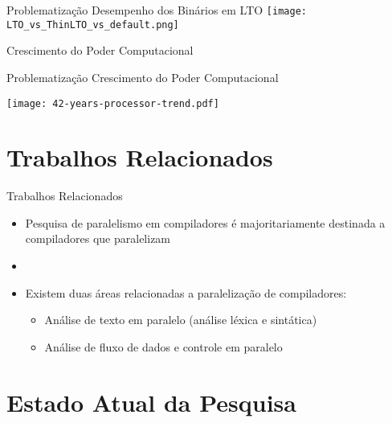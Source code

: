 \begin{frame}{Problematização}
    Desempenho dos Binários em LTO \citep{Johnson:2017:TSI:3049832.3049845}
    \texttt{[image: LTO\_vs\_ThinLTO\_vs\_default.png]}
    \label{fig:performance_lto}
\end{frame}

\begin{frame}[standout]
    Crescimento do Poder Computacional
\end{frame}

\begin{frame}{Problematização}
    Crescimento do Poder Computacional \citep{42years}

    \centering
    \texttt{[image: 42-years-processor-trend.pdf]}
    \label{fig:42years}
\end{frame}

\section{Trabalhos Relacionados}

\begin{frame}{Trabalhos Relacionados}
    \begin{itemize}
        \item Pesquisa de paralelismo em compiladores é majoritariamente destinada a compiladores que paralelizam
        \item[]
        \item Existem duas áreas relacionadas a paralelização de compiladores:
        \begin{itemize}
            \item Análise de texto em paralelo (análise léxica e sintática)
            \item Análise de fluxo de dados e controle em paralelo
        \end{itemize}
    \end{itemize}
\end{frame}

\section{Estado Atual da Pesquisa}

